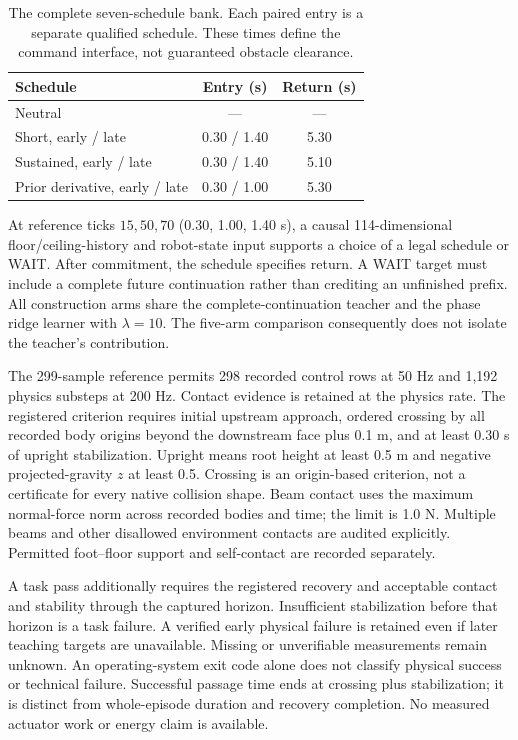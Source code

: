 \documentclass[letterpaper,10pt,conference]{ieeeconf}
\begin{document}
\begin{table}[t]\centering\small
\begin{tabular}{lcc}\toprule
Schedule & Entry (s) & Return (s)\\\midrule
Neutral & --- & ---\\
Short, early / late & 0.30 / 1.40 & 5.30\\
Sustained, early / late & 0.30 / 1.40 & 5.10\\
Prior derivative, early / late & 0.30 / 1.00 & 5.30\\\bottomrule
\end{tabular}
\caption{The complete seven-schedule bank. Each paired entry is a separate
qualified schedule. These times define the command interface, not guaranteed
obstacle clearance.}\label{tab:bank}
\end{table}

At reference ticks $15,50,70$ (0.30, 1.00, 1.40 s), a causal 114-dimensional
floor/ceiling-history and robot-state input supports a choice of a legal schedule
or WAIT. After commitment, the schedule specifies return. A WAIT target must
include a complete future continuation rather than crediting an unfinished
prefix. All construction arms share the complete-continuation teacher and the
phase ridge learner with $\lambda=10$. The five-arm comparison consequently
does not isolate the teacher's contribution.

The 299-sample reference permits 298 recorded control rows at 50 Hz and 1,192
physics substeps at 200 Hz. Contact evidence is retained at the physics rate.
The registered criterion requires initial upstream approach, ordered crossing
by all recorded body origins beyond the downstream face plus 0.1 m, and at least 0.30 s of upright stabilization.
Upright means root height at least 0.5 m and negative projected-gravity $z$
at least 0.5. Crossing is an origin-based criterion, not a certificate for every
native collision shape. Beam contact uses the maximum normal-force norm across
recorded bodies and time; the limit is 1.0 N. Multiple beams and other disallowed
environment contacts are audited explicitly. Permitted foot--floor support and
self-contact are recorded separately.

A task pass additionally requires the registered recovery and acceptable
contact and stability through the captured horizon. Insufficient stabilization
before that horizon is a task failure. A verified early physical failure is
retained even if later teaching targets are unavailable. Missing or unverifiable
measurements remain unknown. An operating-system exit code alone does not
classify physical success or technical failure. Successful passage time ends at
crossing plus stabilization; it is distinct from whole-episode duration and
recovery completion. No measured actuator work or energy claim is available.
\end{document}
